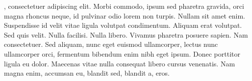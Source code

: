 
, consectetuer adipiscing elit. Morbi commodo, ipsum sed
pharetra gravida, orci magna rhoncus neque, id pulvinar odio lorem non turpis. Nullam sit amet
enim. Suspendisse id velit vitae ligula volutpat condimentum. Aliquam erat volutpat. Sed quis
velit. Nulla facilisi. Nulla libero. Vivamus pharetra posuere sapien. Nam consectetuer. Sed
aliquam, nunc eget euismod ullamcorper, lectus nunc ullamcorper orci, fermentum bibendum enim nibh
eget ipsum. Donec porttitor ligula eu dolor. Maecenas vitae nulla consequat libero cursus
venenatis. Nam magna enim, accumsan eu, blandit sed, blandit a, eros.
